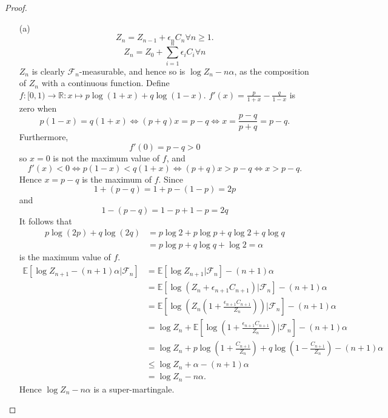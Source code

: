 \documentclass{article}
\begin{document}
\begin{proof}
\begin{enumerate}
\item[(a)] \[Z_n=Z_{n-1}+\epsilon_nC_n\forall n\geq1.\]\[Z_n=Z_0+\sum_{i=1}^n\epsilon_iC_i\forall n\]$Z_n$ is clearly $\mathcal{F}_n$-measurable, and hence so is $\log Z_n-n\alpha$, as the composition of $Z_n$ with a continuous function. Define $f:[0,1)\to\mathbb{R}:x\mapsto p\log(1+x)+q\log(1-x)$. $f'(x)=\frac{p}{1+x}-\frac{q}{1-x}$ is zero when \[p(1-x)=q(1+x)\iff (p+q)x=p-q\iff x=\frac{p-q}{p+q}=p-q.\] Furthermore,\[f'(0)=p-q>0\] so $x=0$ is not the maximum value of $f$, and \[f'(x)<0\iff p(1-x)<q(1+x)\iff (p+q)x>p-q\iff x>p-q.\] Hence $x=p-q$ is the maximum of $f$. Since \[1+(p-q)=1+p-(1-p)=2p\] and \[1-(p-q)=1-p+1-p=2q\] It follows that \begin{align*}p\log(2p)+q\log(2q)&=p\log 2+p\log p + q\log 2 +q\log q\\&=p\log p+q\log q+\log 2=\alpha\end{align*} is the maximum value of $f$.\begin{align*}
\mathbb{E}[\log Z_{n+1}-(n+1)\alpha|\mathcal{F}_n]&=\mathbb{E}[\log Z_{n+1}|\mathcal{F}_n]-(n+1)\alpha\\&=\mathbb{E}[\log(Z_n+\epsilon_{n+1}C_{n+1})|\mathcal{F}_n]-(n+1)\alpha\\&=\mathbb{E}\left[\log\left(Z_n\left(1+\frac{\epsilon_{n+1}C_{n+1}}{Z_n}\right)\right)|\mathcal{F}_n\right]-(n+1)\alpha\\&=\log Z_n+\mathbb{E}\left[\log\left(1+\frac{\epsilon_{n+1}C_{n+1}}{Z_n}\right)|\mathcal{F}_n\right]-(n+1)\alpha\\&=\log Z_n+p\log\left(1+\frac{C_{n+1}}{Z_n}\right)+q\log\left(1-\frac{C_{n+1}}{Z_n}\right)-(n+1)\alpha\\&\leq\log Z_n+\alpha-(n+1)\alpha\\&=\log Z_n-n\alpha.
\end{align*}Hence $\log Z_n-n\alpha$ is a super-martingale.
\end{enumerate}
\end{proof}
\end{document}
